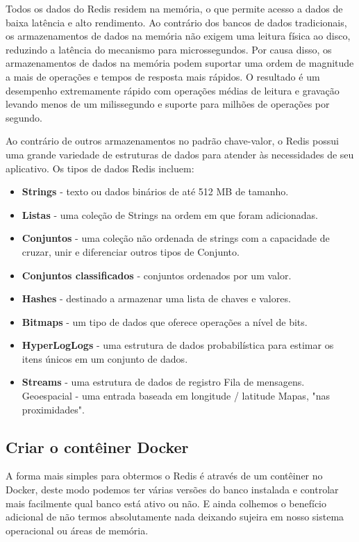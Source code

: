 \documentclass[a4paper,11pt]{article}
\begin{document}
Todos os dados do Redis residem na memória, o que permite acesso a dados de baixa latência e alto rendimento. Ao contrário dos bancos de dados tradicionais, os armazenamentos de dados na memória não exigem uma leitura física ao disco, reduzindo a latência do mecanismo para microssegundos. Por causa disso, os armazenamentos de dados na memória podem suportar uma ordem de magnitude a mais de operações e tempos de resposta mais rápidos. O resultado é um desempenho extremamente rápido com operações médias de leitura e gravação levando menos de um milissegundo e suporte para milhões de operações por segundo.

Ao contrário de outros armazenamentos no padrão chave-valor, o Redis possui uma grande variedade de estruturas de dados para atender às necessidades de seu aplicativo. Os tipos de dados Redis incluem:
\begin{itemize}[nolistsep]
  \item \textbf{Strings} - texto ou dados binários de até 512 MB de tamanho.
  \item \textbf{Listas} - uma coleção de Strings na ordem em que foram adicionadas.
  \item \textbf{Conjuntos} - uma coleção não ordenada de strings com a capacidade de cruzar, unir e diferenciar outros tipos de Conjunto.
  \item \textbf{Conjuntos classificados} - conjuntos ordenados por um valor.
  \item \textbf{Hashes} - destinado a armazenar uma lista de chaves e valores.
  \item \textbf{Bitmaps} - um tipo de dados que oferece operações a nível de bits.
  \item \textbf{HyperLogLogs} - uma estrutura de dados probabilística para estimar os itens únicos em um conjunto de dados.
  \item \textbf{Streams} - uma estrutura de dados de registro Fila de mensagens.
  Geoespacial - uma entrada baseada em longitude / latitude Mapas, "nas proximidades".
\end{itemize}

\subsection{Criar o contêiner Docker}
A forma mais simples para obtermos o Redis é através de um contêiner no Docker, deste modo podemos ter várias versões do banco instalada e controlar mais facilmente qual banco está ativo ou não. E ainda colhemos o benefício adicional de não termos absolutamente nada deixando sujeira em nosso sistema operacional ou áreas de memória.
\end{document}
